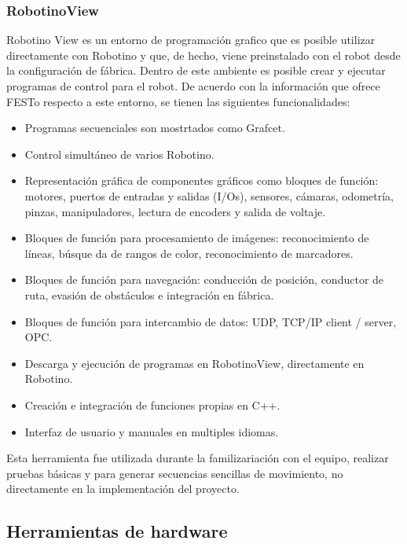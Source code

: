             \subsubsection{RobotinoView}
            Robotino View es un entorno de programación grafico que es posible utilizar directamente con Robotino y que, de hecho, viene preinstalado con el robot desde la configuración de fábrica. Dentro de este ambiente es posible crear y ejecutar programas de control para el robot.
            De acuerdo con la información que ofrece FESTo respecto a este entorno, se tienen las siguientes funcionalidades\cite{FESTO-RobotinoView}:
            \begin{itemize}
                \item Programas secuenciales son mostrtados como Grafcet.
                \item Control simultáneo de varios Robotino.
                \item Representación gráfica de componentes gráficos como bloques de función: motores, puertos de entradas y salidas (I/Os), sensores, cámaras, odometría, pinzas, manipuladores, lectura de encoders y salida de voltaje.
                \item Bloques de función para procesamiento de imágenes: reconocimiento de líneas, búsque da de rangos de color, reconocimiento de marcadores.
                \item Bloques de función para navegación: conducción de posición, conductor de ruta, evasión de obstáculos e integración en fábrica.
                \item Bloques de función para intercambio de datos: UDP, TCP/IP client / server, OPC.
                \item Descarga y ejecución de programas en RobotinoView, directamente en Robotino.
                \item Creación e integración de funciones propias en C++.
                \item Interfaz de usuario y manuales en multiples idiomas.
            \end{itemize}

            Esta herramienta fue utilizada durante la familizariación con el equipo, realizar pruebas básicas y para generar secuencias sencillas de movimiento, no directamente en la implementación del proyecto.
            
        \subsection{Herramientas de hardware}
